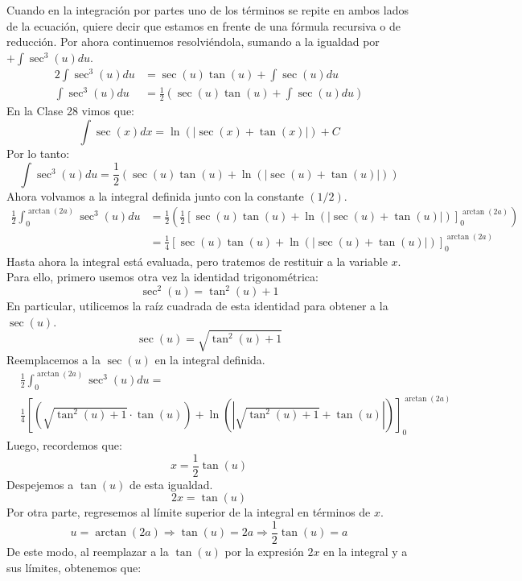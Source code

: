 \documentclass[12pt]{article}
\begin{document}
Cuando en la integración por partes uno de los términos se repite en ambos lados de la ecuación, quiere decir que estamos en frente de una fórmula recursiva o de reducción. Por ahora continuemos resolviéndola, sumando a la igualdad por $+ \int \sec^{3}(u)du$.
\begin{align*}
  2 \int \sec^{3}(u) du &= \sec(u) \tan(u) + \int \sec(u)du \\
  \int \sec^{3}(u) du &= \frac{1}{2} \left(\sec(u) \tan(u) + \int \sec(u)du\right)
\end{align*}
En la Clase 28 vimos que:
\[
  \int \sec(x)dx = \ln(|\sec(x) + \tan(x)|) + C
\]
Por lo tanto:
\[
  \int \sec^{3}(u) du = \frac{1}{2} \left(\sec(u) \tan(u) + \ln(|\sec(u) + \tan(u)|)\right)
\]
Ahora volvamos a la integral definida junto con la constante $(1/2)$.
\begin{align*}
  \frac{1}{2} \int_{0}^{\arctan(2a)} \sec^{3}(u) du &= \frac{1}{2}\left(\frac{1}{2}[\sec(u) \tan(u) + \ln(|\sec(u) + \tan(u)|)]_{0}^{\arctan(2a)}\right) \\
                                                    &= \frac{1}{4} \left[\sec(u) \tan(u) + \ln(|\sec(u) + \tan(u)|)\right]_{0}^{\arctan(2a)}
\end{align*}
Hasta ahora la integral está evaluada, pero tratemos de restituir a la variable $x$. Para ello, primero usemos otra vez la identidad trigonométrica:
\[
  \sec^{2}(u) = \tan^{2}(u) + 1
\]
En particular, utilicemos la raíz cuadrada de esta identidad para obtener a la $\sec(u)$.
\[
  \sec(u) = \sqrt{\tan^{2}(u) + 1}
\]
Reemplacemos a la $\sec(u)$ en la integral definida.
\begin{align*}
  &\frac{1}{2} \int_{0}^{\arctan(2a)} \sec^{3}(u) du = \\
  &\frac{1}{4} \left[
                 \left(\sqrt{\tan^{2}(u) + 1}\cdot \tan(u) \right) +
                 \ln\left(\left|\sqrt{\tan^{2}(u) + 1} + \tan(u)\right|\right)
               \right]_{0}^{\arctan(2a)}
\end{align*}
Luego, recordemos que:
\[
  x = \frac{1}{2} \tan(u)
\]
Despejemos a $\tan(u)$ de esta igualdad.
\[
  2x = \tan(u)
\]
Por otra parte, regresemos al límite superior de la integral en términos de $x$.
\[
  u = \arctan(2a) \Rightarrow \tan(u) = 2a \Rightarrow \frac{1}{2} \tan(u) = a
\]
De este modo, al reemplazar a la $\tan(u)$ por la expresión $2x$ en la integral y a sus límites, obtenemos que:
\end{document}
